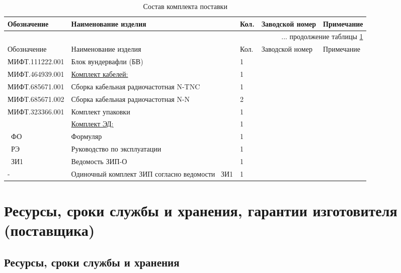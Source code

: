 {\small
\begin{longtable}{|p{5cm}|p{5cm}|p{1cm}|p{2cm}|p{2.5cm}|}

	\caption{\label{tab:compl} Состав комплекта поставки} \\
			
			\hline
	 		Обозначение & Наименование изделия & Кол. & Заводской номер & Примечание  \\ 
	 		\hline
	 		\endfirsthead
	 		
	 		\multicolumn{5}{r}{... продолжение таблицы \ref{tab:compl}}\\ %
	 		\hline
	 		Обозначение & Наименование изделия & Кол. & Заводской номер & Примечание  \\ 
	 		\hline
	 		\endhead
	 		
				 МИФТ.111222.001 & Блок вундервафли (БВ) & 1 &  & \\	\hline
				 
				 МИФТ.464939.001 & \underline{Комплект кабелей:} & 1 & &\\
 				 МИФТ.685671.001 & Сборка кабельная радиочастотная N-TNC	& 1 & &\\
				 МИФТ.685671.002 & Сборка кабельная радиочастотная N-N	& 2 & &\\ \hline
  				 
				 МИФТ.323366.001 & Комплект упаковки & 1 & & \\	\hline
				 
								           & \underline{Комплект ЭД:} 		& 1 & & \\	
				 \decim\ ФО & Формуляр		& 1 & & \\
				 \decim\ РЭ & Руководство по эксплуатации & 1 & & \\
				 \decim\ ЗИ1 & Ведомость ЗИП-О & 1 & & \\ \hline
				 				 
				 - &Одиночный комплект ЗИП согласно ведомости \decim\  ЗИ1 & 1 & &\\	\hline
\end{longtable}
}


\chapter{Ресурсы, сроки службы и хранения, гарантии изготовителя (поставщика)}

\section{Ресурсы, сроки службы и хранения}


